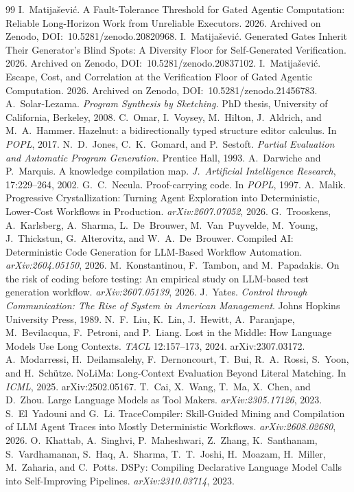 \documentclass[11pt]{article}
\theoremstyle{definition}
\theoremstyle{remark}
\begin{document}
\begin{thebibliography}{99}
\small
{} I.~Matija\v{s}evi\'c. A Fault-Tolerance Threshold for Gated Agentic
Computation: Reliable Long-Horizon Work from Unreliable Executors. 2026.
Archived on Zenodo, DOI:~10.5281/zenodo.20820968.
 I.~Matija\v{s}evi\'c. Generated Gates Inherit Their Generator's Blind
Spots: A Diversity Floor for Self-Generated Verification. 2026.
Archived on Zenodo, DOI:~10.5281/zenodo.20837102.
 I.~Matija\v{s}evi\'c. Escape, Cost, and Correlation at the
Verification Floor of Gated Agentic Computation. 2026.
Archived on Zenodo, DOI:~10.5281/zenodo.21456783.
 A.~Solar-Lezama. \emph{Program Synthesis by Sketching.} PhD thesis,
University of California, Berkeley, 2008.
 C.~Omar, I.~Voysey, M.~Hilton, J.~Aldrich, and M.~A.~Hammer. Hazelnut: a
bidirectionally typed structure editor calculus. In \emph{POPL}, 2017.
 N.~D.~Jones, C.~K.~Gomard, and P.~Sestoft. \emph{Partial Evaluation and Automatic
Program Generation.} Prentice Hall, 1993.
 A.~Darwiche and P.~Marquis. A knowledge compilation map.
\emph{J.~Artificial Intelligence Research}, 17:229--264, 2002.
 G.~C.~Necula. Proof-carrying code. In \emph{POPL}, 1997.
 A.~Malik. Progressive Crystallization: Turning Agent Exploration
into Deterministic, Lower-Cost Workflows in Production. \emph{arXiv:2607.07052}, 2026.
 G.~Trooskens, A.~Karlsberg, A.~Sharma, L.~De~Brouwer,
M.~Van~Puyvelde, M.~Young, J.~Thickstun, G.~Alterovitz, and W.~A.~De~Brouwer. Compiled AI:
Deterministic Code Generation for LLM-Based Workflow Automation. \emph{arXiv:2604.05150}, 2026.
 M.~Konstantinou, F.~Tambon, and M.~Papadakis. On the risk of coding
before testing: An empirical study on LLM-based test generation workflow.
\emph{arXiv:2607.05139}, 2026.
 J.~Yates. \emph{Control through Communication: The Rise of System in American
Management}. Johns Hopkins University Press, 1989.
 N.~F.~Liu, K.~Lin, J.~Hewitt, A.~Paranjape, M.~Bevilacqua, F.~Petroni, and
P.~Liang. Lost in the Middle: How Language Models Use Long Contexts. \emph{TACL} 12:157--173, 2024. arXiv:2307.03172.
 A.~Modarressi, H.~Deilamsalehy, F.~Dernoncourt, T.~Bui, R.~A.~Rossi,
S.~Yoon, and H.~Sch\"utze. NoLiMa: Long-Context Evaluation Beyond Literal Matching. In \emph{ICML},
2025. arXiv:2502.05167.
 T.~Cai, X.~Wang, T.~Ma, X.~Chen, and D.~Zhou. Large Language Models as Tool
Makers. \emph{arXiv:2305.17126}, 2023.
 S.~El~Yadouni and G.~Li. TraceCompiler: Skill-Guided Mining and
Compilation of LLM Agent Traces into Mostly Deterministic Workflows. \emph{arXiv:2608.02680}, 2026.
 O.~Khattab, A.~Singhvi, P.~Maheshwari, Z.~Zhang, K.~Santhanam, S.~Vardhamanan,
S.~Haq, A.~Sharma, T.~T.~Joshi, H.~Moazam, H.~Miller, M.~Zaharia, and C.~Potts. DSPy: Compiling
Declarative Language Model Calls into Self-Improving Pipelines. \emph{arXiv:2310.03714}, 2023.
\end{thebibliography}
\end{document}
